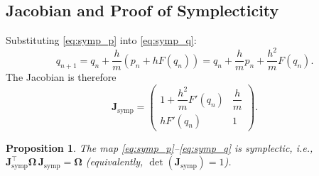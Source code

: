 \documentclass[11pt]{article}
\newtheorem{proposition}[theorem]{Proposition}
\newcommand{\J}{\mathbf{J}}          %
\newcommand{\Omg}{\boldsymbol{\Omega}} %
\begin{document}
\subsection{Jacobian and Proof of Symplecticity}

Substituting \eqref{eq:symp_p} into \eqref{eq:symp_q}:
\[
  q_{n+1} = q_n + \frac{h}{m}(p_n + hF(q_n))
           = q_n + \frac{h}{m}p_n + \frac{h^2}{m}F(q_n).
\]
The Jacobian is therefore
\begin{equation}\label{eq:symp_jacobian}
  \J_{\mathrm{symp}} =
  \begin{pmatrix}
    1 + \dfrac{h^2}{m}F'(q_n) & \dfrac{h}{m} \\[8pt]
    h F'(q_n) & 1
  \end{pmatrix}.
\end{equation}

\begin{proposition}\label{prop:symplectic}
  The map \eqref{eq:symp_p}--\eqref{eq:symp_q} is symplectic, i.e.,
  $\J_{\mathrm{symp}}^{\top}\Omg\,\J_{\mathrm{symp}} = \Omg$ (equivalently,
  $\det(\J_{\mathrm{symp}}) = 1$).
\end{proposition}
\end{document}
